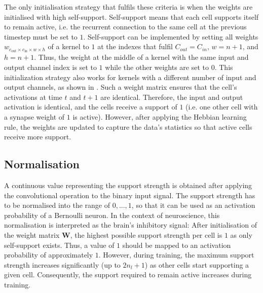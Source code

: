 The only initialisation strategy that fulfils these criteria is when the weights are initialised with high self-support.
Self-support means that each cell supports itself to remain active, i.e. the recurrent connection to the same cell at the previous timestep must be set to $1$.
Self-support can be implemented by setting all weights $w_{c_{\text{out}} \times c_{\text{in}} \times w \times h}$ of a kernel to $1$ at the indexes that fulfil 
$C_{out} = C_{in}$, $w = n+1$, and $h = n+1$. Thus, the weight at the middle of a kernel with the same input and output channel index is set to $1$ while the other weights are set to $0$. This initialization strategy also works for kernels with a different number of input and output channels, as shown in .
Such a weight matrix ensures that the cell's activations at time $t$ and $t+1$ are identical. Therefore, the input and output activation is identical, and the cells receive a support of $1$ (i.e. one other cell with a synapse weight of $1$ is active).
However, after applying the Hebbian learning rule, the weights are updated to capture the data's statistics so that active cells receive more support.

















\subsection{Normalisation}
A continuous value representing the support strength is obtained after applying the convolutional operation to the binary input signal.
The support strength has to be normalised into the range of $0, ..., 1$, so that it can be used as an activation probability of a Bernoulli neuron.
In the context of neuroscience, this normalisation is interpreted as the brain's inhibitory signal:
After initialisation of the weight matrix $\boldsymbol{W}$, the highest possible support strength per cell is $1$ as only self-support exists. Thus, a value of $1$ should be mapped to an activation probability of approximately $1$. However, during training, the maximum support strength  increases significantly (up to $2n_l + 1$) as other cells start supporting a given cell.
Consequently, the support required to remain active increases during training.

